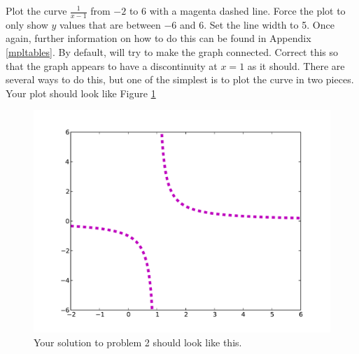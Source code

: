 	
\begin{problem} Plot the curve $\frac{1}{x-1}$ from $-2$ to $6$ with a 
magenta dashed line. Force the plot to only show $y$ values that are between $-6$ and $6$. Set the line width to 5. Once again, further information on how to do this can be found in Appendix \ref{mpltables}. By default,  will try to make the graph connected. Correct this so that the graph appears to have a discontinuity at $x=1$ as it should. There are several ways to do this, but one of the simplest is to plot the curve in two pieces.
Your plot should look like Figure \ref{mpl:problem2} 
\end{problem}

\begin{figure}
\includegraphics[width=\textwidth]{prob2.pdf}
\caption{Your solution to problem 2 should look like this.}
\label{mpl:problem2} 
\end{figure}

